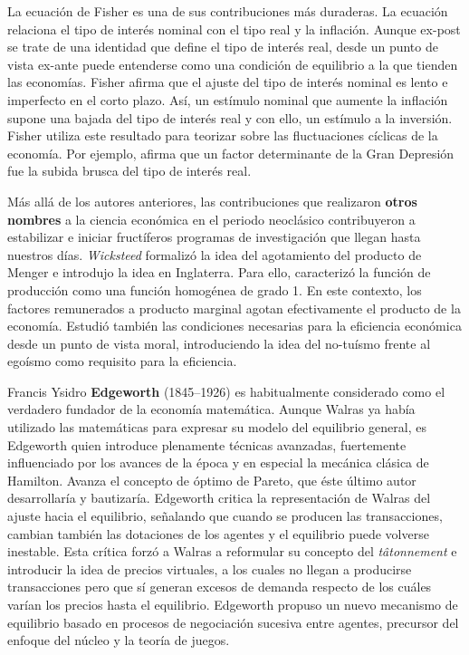 \documentclass{nuevotema}
\begin{document}
La ecuación de Fisher es una de sus contribuciones más duraderas. La ecuación relaciona el tipo de interés nominal con el tipo real y la inflación. Aunque ex-post se trate de una identidad que define el tipo de interés real, desde un punto de vista ex-ante puede entenderse como una condición de equilibrio a la que tienden las economías. Fisher afirma que el ajuste del tipo de interés nominal es lento e imperfecto en el corto plazo. Así, un estímulo nominal que aumente la inflación supone una bajada del tipo de interés real y con ello, un estímulo a la inversión. Fisher utiliza este resultado para teorizar sobre las fluctuaciones cíclicas de la economía. Por ejemplo, afirma que un factor determinante de la Gran Depresión fue la subida brusca del tipo de interés real. 

Más allá de los autores anteriores, las contribuciones que realizaron \textbf{otros nombres} a la ciencia económica en el periodo neoclásico contribuyeron a estabilizar e iniciar fructíferos programas de investigación que llegan hasta nuestros días. \textit{Wicksteed} formalizó la idea del agotamiento del producto de Menger e introdujo la idea en Inglaterra. Para ello, caracterizó la función de producción como una función homogénea de grado 1. En este contexto, los factores remunerados a producto marginal agotan efectivamente el producto de la economía. Estudió también las condiciones necesarias para la eficiencia económica desde un punto de vista moral, introduciendo la idea del no-tuísmo frente al egoísmo como requisito para la eficiencia. 

Francis Ysidro \textbf{Edgeworth} (1845--1926) es habitualmente considerado como el verdadero fundador de la economía matemática. Aunque Walras ya había utilizado las matemáticas para expresar su modelo del equilibrio general, es Edgeworth quien introduce plenamente técnicas avanzadas, fuertemente influenciado por los avances de la época y en especial la mecánica clásica de Hamilton. Avanza el concepto de óptimo de Pareto, que éste último autor desarrollaría y bautizaría. Edgeworth critica la representación de Walras del ajuste hacia el equilibrio, señalando que cuando se producen las transacciones, cambian también las dotaciones de los agentes y el equilibrio puede volverse inestable. Esta crítica forzó a Walras a reformular su concepto del \textit{tâtonnement} e introducir la idea de precios virtuales, a los cuales no llegan a producirse transacciones pero que sí generan excesos de demanda respecto de los cuáles varían los precios hasta el equilibrio. Edgeworth propuso un nuevo mecanismo de equilibrio basado en procesos de negociación sucesiva entre agentes, precursor del enfoque del núcleo y la teoría de juegos.
\end{document}
